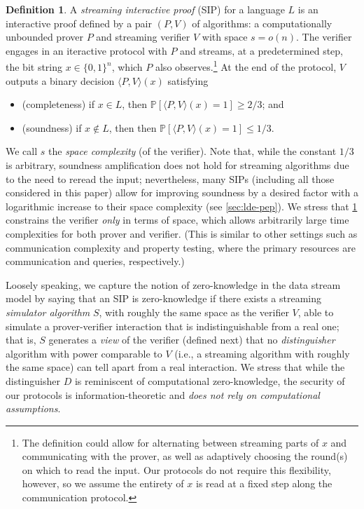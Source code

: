 \documentclass[a4paper,UKenglish,cleveref, autoref, thm-restate]{lipics-v2021}
\theoremstyle{definition}
\newtheorem{definition}[theorem]{Definition}
\renewcommand{\P}{\mathbb P}
\newcommand{\bitset}{\{0,1\}}
\begin{document}
\begin{definition}
    \label{def:sip}
    A \emph{streaming interactive proof} (SIP) for a language $L$ is an interactive proof defined by a pair $(P,V)$ of algorithms: a computationally unbounded prover $P$ and streaming verifier $V$ with space $s = o(n)$. The verifier engages in an iteractive protocol with $P$ and streams, at a predetermined step, the bit string $x \in \bitset^n$, which $P$ also observes.\footnote{The definition could allow for alternating between streaming parts of $x$ and communicating with the prover, as well as adaptively choosing the round(s) on which to read the input. Our protocols do not require this flexibility, however, so we assume the entirety of $x$ is read at a fixed step along the communication protocol.} At the end of the protocol, $V$ outputs a binary decision $\langle P,V \rangle(x)$ satisfying
    \begin{itemize}
        \item (completeness) if $x \in L$, then $\P[\langle P,V \rangle(x) = 1] \geq 2/3$; and
        \item (soundness) if $x \notin L$, then then $\P[\langle P,V \rangle(x) = 1] \leq 1/3$.
    \end{itemize}
\end{definition}

We call $s$ the \emph{space complexity} (of the verifier).
Note that, while the constant $1/3$ is arbitrary, soundness amplification does not hold for streaming algorithms due to the need to reread the input; nevertheless, many SIPs (including all those considered in this paper) allow for improving soundness by a desired factor with a logarithmic increase to their space complexity (see \cref{sec:lde-pep}). We stress that \cref{def:sip} constrains the verifier \emph{only} in terms of space, which allows arbitrarily large time complexities for both prover and verifier. (This is similar to other settings such as communication complexity and property testing, where the primary resources are communication and queries, respectively.)

Loosely speaking, we capture the notion of zero-knowledge in the data stream model by saying that an SIP is zero-knowledge if there exists a streaming \emph{simulator algorithm} $S$, with roughly the same space as the verifier $V$, able to simulate a prover-verifier interaction that is indistinguishable from a real one; that is, $S$ generates a \emph{view} of the verifier (defined next) that no \emph{distinguisher} algorithm with power comparable to $V$ (i.e., a streaming algorithm with roughly the same space) can tell apart from a real interaction. We stress that while the distinguisher $D$ is reminiscent of computational zero-knowledge, the security of our protocols is information-theoretic and \emph{does not rely on computational assumptions}.
\end{document}
